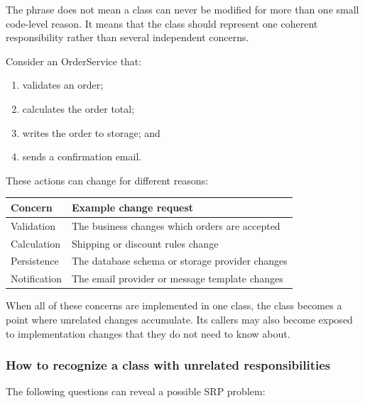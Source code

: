 \documentclass[12pt,a4paper]{article}
\begin{document}
The phrase does not mean a class can never be modified for more than one small code-level reason. It means that the class should represent one coherent responsibility rather than several independent concerns.

Consider an OrderService that:

\begin{enumerate}

\item validates an order;

\item calculates the order total;

\item writes the order to storage; and

\item sends a confirmation email.

\end{enumerate}

These actions can change for different reasons:

\begin{table}[htbp]
\centering
\small
\begin{tabularx}{\textwidth}{>{\raggedright\arraybackslash}p{}X}
\toprule
Concern & Example change request \\
\midrule
Validation & The business changes which orders are accepted \\
Calculation & Shipping or discount rules change \\
Persistence & The database schema or storage provider changes \\
Notification & The email provider or message template changes \\
\bottomrule
\end{tabularx}
\end{table}

When all of these concerns are implemented in one class, the class becomes a point where unrelated changes accumulate. Its callers may also become exposed to implementation changes that they do not need to know about.

\subsubsection{How to recognize a class with unrelated responsibilities}

The following questions can reveal a possible SRP problem:
\end{document}
